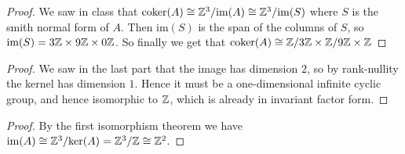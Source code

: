 \documentclass[11pt]{article}
\begin{document}
\begin{proof}
  We saw in class that $\text{coker}(A) \cong \mathbb{Z}^3/\text{im}(A) \cong \mathbb{Z}^3/\text{im}(S)$ where $S$ is the smith normal form of $A$.
  Then $\text{im}(S)$ is the span of the columns of $S$, so $\text{im}(S) = 3\mathbb{Z} \times 9\mathbb{Z} \times 0\mathbb{Z}$.
  So finally we get that $\text{coker}(A) \cong \mathbb{Z}/3\mathbb{Z} \times \mathbb{Z}/9\mathbb{Z} \times \mathbb{Z}$
\end{proof}

\begin{proof}
  We saw in the last part that the image has dimension $2$, so by rank-nullity the kernel has dimension $1$.
  Hence it must be a one-dimensional infinite cyclic group, and hence isomorphic to $\mathbb{Z}$, which is already in invariant factor form.
\end{proof}

\begin{proof}
  By the first isomorphism theorem we have $\text{im}(A) \cong \mathbb{Z}^3/\text{ker}(A) = \mathbb{Z}^3/\mathbb{Z} \cong \mathbb{Z}^2$.
\end{proof}
\end{document}
